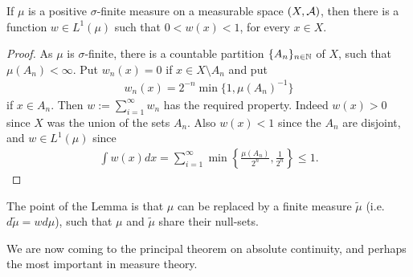\begin{lemma}\label{lem: function w}
If $\mu$ is a positive $\sigma$-finite measure on a measurable space $(X, \mathcal{A})$, then there is a function $w\in L^{1}(\mu)$ such that $0<w(x)<1$, for every $x\in X$.
\end{lemma}
\begin{proof}
As $\mu$ is $\sigma$-finite, there is a countable partition $\{A_{n}\}_{n\in \mathbb{N}}$ of $X$, such that $\mu(A_{n})<\infty$. Put $w_{n}(x)=0$ if $x\in X\setminus A_{n}$ and put
\begin{align*}
	w_{n}(x)=2^{-n}\min\{1, \mu(A_{n})^{-1}\}
\end{align*}
if $x\in A_{n}$. Then $w:=\sum_{i=1}^{\infty}w_{n}$ has the required property. Indeed $w(x)>0$ since $X$ was the union of the sets $A_{n}$. Also $w(x)<1$ since the $A_{n}$ are disjoint, and $w\in L^{1}(\mu)$ since
\begin{align*}
	\int w(x)dx = \sum_{i=1}^{\infty} \min\left\{\frac{\mu(A_{n})}{2^{n}}, \frac{1}{2^{n}}\right\} \le 1.
\end{align*}
\end{proof}

The point of the Lemma is that $\mu$ can be replaced by a finite measure $\tilde{\mu}$ (i.e. $d\tilde{\mu}=wd\mu$), such that $\mu$ and $\tilde{\mu}$ share their null-sets.

We are now coming to the principal theorem on absolute continuity, and perhaps the most important in measure theory.


